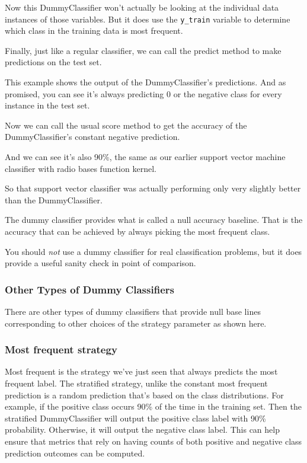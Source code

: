 \begin{multicols}{2}
Now this DummyClassifier won't actually be looking at the individual data instances of those variables. But it does use the \texttt{y_train} variable to determine which class in the training data is most frequent. 

Finally, just like a regular classifier, we can call the predict method to make predictions on the test set. 

This example shows the output of the DummyClassifier's predictions. And as promised, you can see it's always predicting 0 or the negative class for every instance in the test set. 

Now we can call the usual score method to get the accuracy of the DummyClassifier's constant negative prediction. 

And we can see it's also 90\%, the same as our earlier support vector machine classifier with radio bases function kernel. 

So that support vector classifier was actually performing only very slightly better than the DummyClassifier. 

The dummy classifier provides what is called a null accuracy baseline. That is the accuracy that can be achieved by always picking the most frequent class. 

You should \emph{not} use a dummy classifier for real classification problems, but it does provide a useful sanity check in point of comparison. 

\subsubsection{Other Types of Dummy Classifiers}

There are other types of dummy classifiers that provide null base lines corresponding to other choices of the strategy parameter as shown here. 

\subsubsection*{Most frequent strategy}

Most frequent is the strategy we've just seen that always predicts the most frequent label. The stratified strategy, unlike the constant most frequent prediction is a random prediction that's based on the class distributions. For example, if the positive class occurs 90\% of the time in the training set. Then the stratified DummyClassifier will output the positive class label with 90\% probability. Otherwise, it will output the negative class label. 
This can help ensure that metrics that rely on having counts of both positive and negative class prediction outcomes can be computed. 


\end{multicols}
